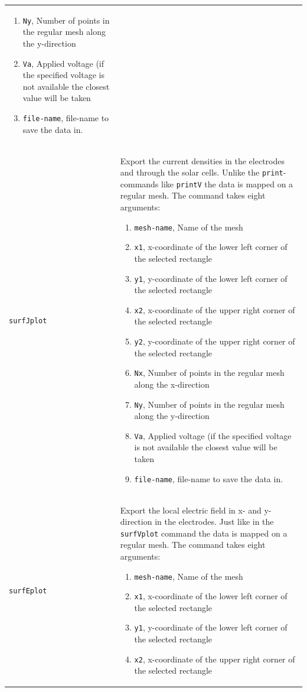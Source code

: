 \documentclass[noshowpacs,preprintnumbers,amsmath,amssymb, letter]{revtex4}
\begin{document}
\begin{longtable}{p{}p{}}
\begin{enumerate}
\item \texttt{Ny}, Number of points in the regular mesh along the y-direction
\item \texttt{Va}, Applied voltage (if the specified voltage is not available the closest value will be taken
\item \texttt{file-name}, file-name to save the data in.
\end{enumerate}\\
\texttt{surfJplot}		& Export the current densities in the electrodes and through the solar cells. Unlike the \texttt{print}-commands like \texttt{printV} the data is mapped on a regular mesh. The command takes eight arguments:
\begin{enumerate}
\item \texttt{mesh-name}, Name of the mesh
\item \texttt{x1}, x-coordinate of the lower left corner of the selected rectangle
\item \texttt{y1}, y-coordinate of the lower left corner of the selected rectangle
\item \texttt{x2}, x-coordinate of the upper right corner of the selected rectangle
\item \texttt{y2}, y-coordinate of the upper right corner of the selected rectangle
\item \texttt{Nx}, Number of points in the regular mesh along the x-direction
\item \texttt{Ny}, Number of points in the regular mesh along the y-direction
\item \texttt{Va}, Applied voltage (if the specified voltage is not available the closest value will be taken
\item \texttt{file-name}, file-name to save the data in.
\end{enumerate}\\
\texttt{surfEplot}		& Export the local electric field in x- and y- direction in the electrodes. Just like in the \texttt{surfVplot} command the data is mapped on a regular mesh. The command takes eight arguments:
\begin{enumerate}
\item \texttt{mesh-name}, Name of the mesh
\item \texttt{x1}, x-coordinate of the lower left corner of the selected rectangle
\item \texttt{y1}, y-coordinate of the lower left corner of the selected rectangle
\item \texttt{x2}, x-coordinate of the upper right corner of the selected rectangle

\end{enumerate}
\end{longtable}
\end{document}
